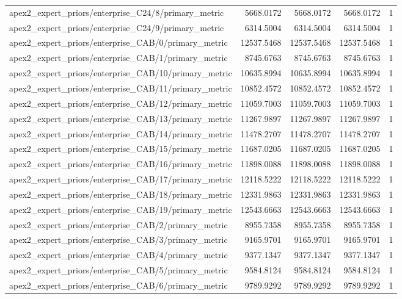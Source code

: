\begin{table}[h]
\begin{tabular}{lrrrr}
apex2_expert_priors/enterprise_C24/8/primary_metric & 5668.0172 & 5668.0172 & 5668.0172 & 1 \\
apex2_expert_priors/enterprise_C24/9/primary_metric & 6314.5004 & 6314.5004 & 6314.5004 & 1 \\
apex2_expert_priors/enterprise_CAB/0/primary_metric & 12537.5468 & 12537.5468 & 12537.5468 & 1 \\
apex2_expert_priors/enterprise_CAB/1/primary_metric & 8745.6763 & 8745.6763 & 8745.6763 & 1 \\
apex2_expert_priors/enterprise_CAB/10/primary_metric & 10635.8994 & 10635.8994 & 10635.8994 & 1 \\
apex2_expert_priors/enterprise_CAB/11/primary_metric & 10852.4572 & 10852.4572 & 10852.4572 & 1 \\
apex2_expert_priors/enterprise_CAB/12/primary_metric & 11059.7003 & 11059.7003 & 11059.7003 & 1 \\
apex2_expert_priors/enterprise_CAB/13/primary_metric & 11267.9897 & 11267.9897 & 11267.9897 & 1 \\
apex2_expert_priors/enterprise_CAB/14/primary_metric & 11478.2707 & 11478.2707 & 11478.2707 & 1 \\
apex2_expert_priors/enterprise_CAB/15/primary_metric & 11687.0205 & 11687.0205 & 11687.0205 & 1 \\
apex2_expert_priors/enterprise_CAB/16/primary_metric & 11898.0088 & 11898.0088 & 11898.0088 & 1 \\
apex2_expert_priors/enterprise_CAB/17/primary_metric & 12118.5222 & 12118.5222 & 12118.5222 & 1 \\
apex2_expert_priors/enterprise_CAB/18/primary_metric & 12331.9863 & 12331.9863 & 12331.9863 & 1 \\
apex2_expert_priors/enterprise_CAB/19/primary_metric & 12543.6663 & 12543.6663 & 12543.6663 & 1 \\
apex2_expert_priors/enterprise_CAB/2/primary_metric & 8955.7358 & 8955.7358 & 8955.7358 & 1 \\
apex2_expert_priors/enterprise_CAB/3/primary_metric & 9165.9701 & 9165.9701 & 9165.9701 & 1 \\
apex2_expert_priors/enterprise_CAB/4/primary_metric & 9377.1347 & 9377.1347 & 9377.1347 & 1 \\
apex2_expert_priors/enterprise_CAB/5/primary_metric & 9584.8124 & 9584.8124 & 9584.8124 & 1 \\
apex2_expert_priors/enterprise_CAB/6/primary_metric & 9789.9292 & 9789.9292 & 9789.9292 & 1 \\

\end{tabular}
\end{table}
